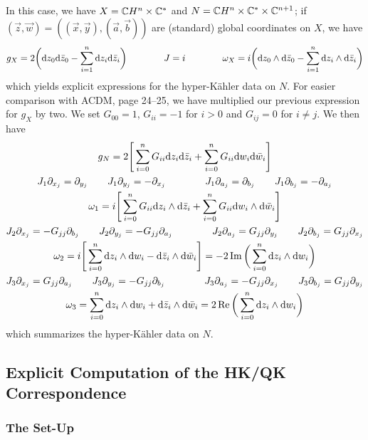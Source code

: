 \documentclass[parskip=half]{scrartcl}
\begin{document}
In this case, we have $X=\mathbb{C} H^n\times \mathbb{C}^*$ and $N=\mathbb{C} H^n\times \mathbb{C}^*\times \mathbb{C}^{n+1}$; if $(\vec z,\vec w)=((\vec x,\vec y), (\vec a,\vec b))$ are (standard) global coordinates on $X$, we have
\begin{equation*}
	g_X =2\bigg( \mathrm{d} z_0 \mathrm{d} \bar z_0 - \sum_{i=1}^n \mathrm{d} z_i \mathrm{d} \bar z_i \bigg) \qquad \qquad 
	J=i \qquad \qquad 
	\omega_X=i\bigg(\mathrm{d} z_0 \wedge \mathrm{d} \bar z_0 - \sum_{i=1}^n \mathrm{d} z_i \wedge \mathrm{d} \bar z_i\bigg)
\end{equation*}
which yields explicit expressions for the hyper-K\"ahler data on $N$. For easier comparison with ACDM, page 24--25, we have multiplied our previous expression for $g_X$ by two. We set $G_{00}=1$, $G_{ii}=-1$ for $i>0$ and $G_{ij}=0$ for $i\neq j$. We then have
\begin{gather*}
	g_N=2\Bigg[\sum_{i=0}^n G_{ii} \mathrm{d} z_i \mathrm{d} \bar z_i+\sum_{i=0}^n G_{ii} \mathrm{d} w_i \mathrm{d} \bar w_i\Bigg]\\
	J_1\partial_{x_j}=\partial_{y_j} \qquad J_1\partial_{y_j}=-\partial_{x_j} \qquad \qquad J_1 \partial_{a_j}=\partial_{b_j} \qquad J_1 \partial_{b_j}=-\partial_{a_j}\\
	\omega_1=i\Bigg[\sum_{i=0}^n G_{ii}\mathrm{d} z_i \wedge \mathrm{d} \bar z_i+\sum_{i=0}^n G_{ii}\mathrm{d} w_i \wedge \mathrm{d} \bar w_i\Bigg]\\
	J_2\partial_{x_j}=-G_{jj}\partial_{b_j}\qquad J_2\partial_{y_j}=-G_{jj}\partial_{a_j} \qquad \qquad J_2 \partial_{a_j}=G_{jj}\partial_{y_j}\qquad J_2\partial_{b_j}=G_{jj}\partial_{x_j}\\
	\omega_2=i\Bigg[\sum_{i=0}^n \mathrm{d} z_i \wedge \mathrm{d} w_i - \mathrm{d} \bar z_i \wedge \mathrm{d} \bar w_i\Bigg]
	=-2\operatorname{Im}\bigg(\sum_{i=0}^n \mathrm{d} z_i \wedge \mathrm{d} w_i\bigg)\\
	J_3\partial_{x_j}=G_{jj}\partial_{a_j} \qquad J_3\partial_{y_j}=-G_{jj}\partial_{b_j}\qquad \qquad J_3\partial_{a_j}=-G_{jj}\partial_{x_j}
	\qquad J_3\partial_{b_j}=G_{jj}\partial_{y_j}\\
	\omega_3=\sum_{i=0}^n \mathrm{d} z_i\wedge \mathrm{d} w_i+\mathrm{d} \bar z_i \wedge \mathrm{d} \bar w_i
	=2\operatorname{Re}\bigg(\sum_{i=0}^n \mathrm{d} z_i \wedge \mathrm{d} w_i\bigg)
\end{gather*}
which summarizes the hyper-K\"ahler data on $N$. 

\subsection{Explicit Computation of the HK/QK Correspondence}

\subsubsection{The Set-Up}
\end{document}
